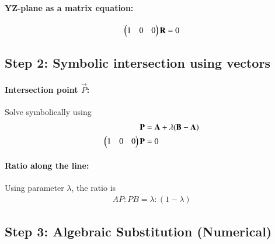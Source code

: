 \documentclass[journal]{IEEEtran}
\begin{document}
\paragraph{YZ-plane as a matrix equation:} 
\begin{align}
\begin{pmatrix}1 & 0 & 0\end{pmatrix} \mathbf{R} = 0 \label{eq:YZ_matrix}
\end{align}

\subsection*{Step 2: Symbolic intersection using vectors}

\paragraph{Intersection point $\vec{P}$:} Solve symbolically using
\begin{align}
\mathbf{P} &= \mathbf{A} + \lambda (\mathbf{B}-\mathbf{A}) \label{eq:P_vector} \\
\begin{pmatrix}1 & 0 & 0\end{pmatrix} \mathbf{P} &= 0 \label{eq:P_matrix}
\end{align}

\paragraph{Ratio along the line:} Using parameter $\lambda$, the ratio is
\begin{align}
AP : PB = \lambda : (1-\lambda) \label{eq:ratio_vector}
\end{align}

\subsection*{Step 3: Algebraic Substitution (Numerical)}
\end{document}
